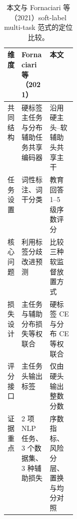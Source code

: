 \begin{table}[H]
\centering
\caption{本文与 Fornaciari 等（2021）soft-label multi-task 范式的定位比较。}
\label{tab:positioning}
\small
\begin{tabularx}{\linewidth}{@{}>{\raggedright\arraybackslash}p{0.16\linewidth}YY@{}}
\toprule
维度 & Fornaciari 等（2021） & 本文 \\
\midrule
共同结构 & 硬标签主任务与分布辅助任务共享编码器 & 沿用硬主头--软辅助头共享主干 \\
任务设置 & 词性标注、词干分类 & 教育回答 1--5 级序数评分 \\
核心问题 & 利用标签分歧改进预测 & 比较三种软监督放置方式 \\
损失设计 & 主任务与辅助分布损失等权联合 & 硬标签 CE 与分布 CE 等权联合 \\
评分接口 & 主任务头输出标签 & 仅由硬头输出整数分数 \\
证据重点 & 2 项 NLP 任务、3 个数据集、3 种辅助损失 & 序数指标、风险分层、置换与均分对照 \\
\bottomrule
\end{tabularx}
\end{table}
